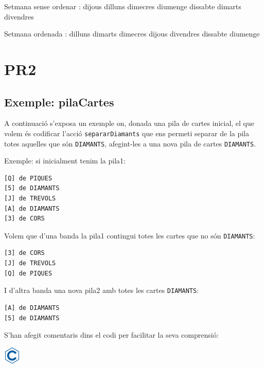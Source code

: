 \documentclass[
]{book}
\newenvironment{Shaded}{\begin{snugshade}}{\end{snugshade}}
\newcommand{\NormalTok}[1]{#1}
\begin{document}
\begin{Shaded}
\begin{Highlighting}[]
\NormalTok{Setmana sense ordenar : }
\NormalTok{dijous}
\NormalTok{dilluns}
\NormalTok{dimecres}
\NormalTok{diumenge}
\NormalTok{dissabte}
\NormalTok{dimarts}
\NormalTok{divendres}

\NormalTok{Setmana ordenada : }
\NormalTok{dilluns}
\NormalTok{dimarts}
\NormalTok{dimecres}
\NormalTok{dijous}
\NormalTok{divendres}
\NormalTok{dissabte}
\NormalTok{diumenge}
\end{Highlighting}
\end{Shaded}

\hypertarget{pr2}{%
\chapter{PR2}\label{pr2}}

\hypertarget{exemple-pilacartes}{%
\section{Exemple: pilaCartes}\label{exemple-pilacartes}}

A continuació s'exposa un exemple on, donada una pila de cartes inicial, el que volem és codificar l'acció \texttt{separarDiamants} que ens permeti separar de la pila totes aquelles que són \texttt{DIAMANTS}, afegint-les a una nova pila de cartes \texttt{DIAMANTS}.

Exemple: si inicialment tenim la pila1:

\begin{verbatim}
[Q] de PIQUES
[5] de DIAMANTS
[J] de TREVOLS
[A] de DIAMANTS
[3] de CORS
\end{verbatim}

Volem que d'una banda la pila1 contingui totes les cartes que no són \texttt{DIAMANTS}:

\begin{verbatim}
[3] de CORS
[J] de TREVOLS
[Q] de PIQUES
\end{verbatim}

I d'altra banda una nova pila2 amb totes les cartes \texttt{DIAMANTS}:

\begin{verbatim}
[A] de DIAMANTS
[5] de DIAMANTS
\end{verbatim}

S'han afegit comentaris dins el codi per facilitar la seva comprensió:

\includegraphics{./img/c.png}
\end{document}
